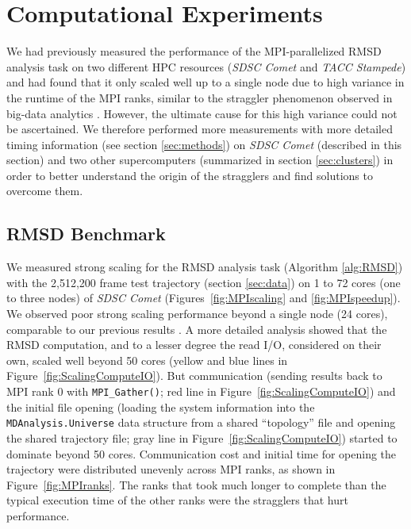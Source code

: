 
\section{Computational Experiments}
\label{sec:experiments}

We had previously measured the performance of the MPI-parallelized RMSD analysis task on two different HPC resources (\emph{SDSC Comet} and \emph{TACC Stampede}) and had found that it only scaled well up to a single node due to high variance in the runtime of the MPI ranks, similar to the straggler phenomenon observed in big-data analytics \cite{Khoshlessan:2017ab}.
However, the ultimate cause for this high variance could not be ascertained.
We therefore performed more measurements with more detailed timing information (see section \ref{sec:methods}) on \emph{SDSC Comet} (described in this section) and two other supercomputers (summarized in section \ref{sec:clusters}) in order to better understand the origin of the stragglers and find solutions to overcome them. 

\subsection{RMSD Benchmark}
\label{sec:RMSD}

We measured strong scaling for the RMSD analysis task (Algorithm \ref{alg:RMSD}) with the 2,512,200 frame test trajectory (section \ref{sec:data}) on 1 to 72 cores (one to three nodes) of \emph{SDSC Comet} (Figures~\ref{fig:MPIscaling} and \ref{fig:MPIspeedup}). 
We observed poor strong scaling performance beyond a single node (24 cores), comparable to our previous results \cite{Khoshlessan:2017ab}.
A more detailed analysis showed that the RMSD computation, and to a lesser degree the read I/O, considered on their own, scaled well beyond 50 cores (yellow and blue lines in Figure~\ref{fig:ScalingComputeIO}). 
But communication (sending results back to MPI rank 0 with \texttt{MPI\_Gather()}; red line in Figure~\ref{fig:ScalingComputeIO}) and the initial file opening (loading the system information into the \texttt{MDAnalysis.Universe} data structure from a shared ``topology'' file and opening the shared trajectory file; gray line in Figure~\ref{fig:ScalingComputeIO}) started to dominate beyond 50 cores.
Communication cost and initial time for opening the trajectory were distributed unevenly across MPI ranks, as shown in Figure~\ref{fig:MPIranks}. 
The ranks that took much longer to complete than the typical execution time of the other ranks were the stragglers that hurt performance.

